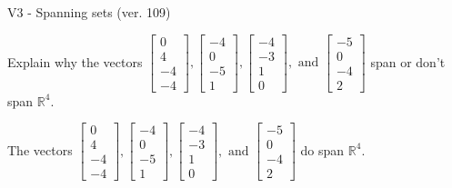 \begin{exercise}
  \begin{exerciseTitle}V3 - Spanning sets (ver. 109)\end{exerciseTitle}
  \begin{exerciseStatement}
    Explain why the vectors \(\left[\begin{array}{r}
0 \\
4 \\
-4 \\
-4
\end{array}\right] , \left[\begin{array}{r}
-4 \\
0 \\
-5 \\
1
\end{array}\right] , \left[\begin{array}{r}
-4 \\
-3 \\
1 \\
0
\end{array}\right] , \text{ and } \left[\begin{array}{r}
-5 \\
0 \\
-4 \\
2
\end{array}\right]\) span or don't span \(\mathbb{R}^4\). 
	


  \end{exerciseStatement}
  \begin{exerciseAnswer}
   The vectors \(\left[\begin{array}{r}
0 \\
4 \\
-4 \\
-4
\end{array}\right] , \left[\begin{array}{r}
-4 \\
0 \\
-5 \\
1
\end{array}\right] , \left[\begin{array}{r}
-4 \\
-3 \\
1 \\
0
\end{array}\right] , \text{ and } \left[\begin{array}{r}
-5 \\
0 \\
-4 \\
2
\end{array}\right]\) 
  	 do  
	span \(\mathbb{R}^4\).
  


  \end{exerciseAnswer}
\end{exercise}
